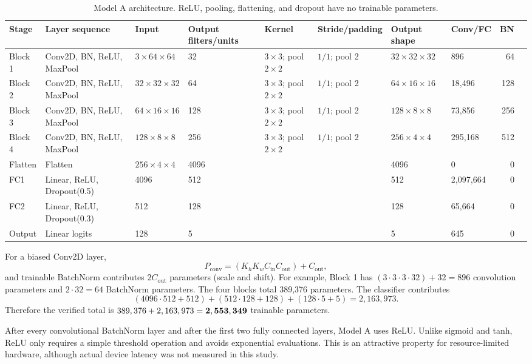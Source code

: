 \documentclass[11pt,a4paper]{article}
\renewcommand{\arraystretch}{1.30}
\newcommand{\dash}{\textemdash}
\begin{document}
\begin{table}[htbp]
\centering
\fontsize{6}{7}\selectfont
\setlength{\tabcolsep}{2pt}
\renewcommand{\arraystretch}{1.05}
\caption{Model A architecture. ReLU, pooling, flattening, and dropout have no trainable parameters.}
\begin{tabular*}{\linewidth}{@{\extracolsep{\fill}}llllllllrr}
\toprule
Stage & Layer sequence & Input & Output filters/units & Kernel & Stride/padding & Output shape & Conv/FC & BN\\
\midrule
Block 1 & Conv2D, BN, ReLU, MaxPool & $3\times64\times64$ & 32 & $3\times3$; pool $2\times2$ & $1/1$; pool 2 & $32\times32\times32$ & 896 & 64\\
Block 2 & Conv2D, BN, ReLU, MaxPool & $32\times32\times32$ & 64 & $3\times3$; pool $2\times2$ & $1/1$; pool 2 & $64\times16\times16$ & 18,496 & 128\\
Block 3 & Conv2D, BN, ReLU, MaxPool & $64\times16\times16$ & 128 & $3\times3$; pool $2\times2$ & $1/1$; pool 2 & $128\times8\times8$ & 73,856 & 256\\
Block 4 & Conv2D, BN, ReLU, MaxPool & $128\times8\times8$ & 256 & $3\times3$; pool $2\times2$ & $1/1$; pool 2 & $256\times4\times4$ & 295,168 & 512\\
Flatten & Flatten & $256\times4\times4$ & 4096 & \dash & \dash & 4096 & 0 & 0\\
FC1 & Linear, ReLU, Dropout(0.5) & 4096 & 512 & \dash & \dash & 512 & 2,097,664 & 0\\
FC2 & Linear, ReLU, Dropout(0.3) & 512 & 128 & \dash & \dash & 128 & 65,664 & 0\\
Output & Linear logits & 128 & 5 & \dash & \dash & 5 & 645 & 0\\
\bottomrule
\end{tabular*}
\end{table}



For a biased Conv2D layer,
\[
P_{\mathrm{conv}}=(K_hK_wC_{\mathrm{in}}C_{\mathrm{out}})+C_{\mathrm{out}},
\]
and trainable BatchNorm contributes $2C_{\mathrm{out}}$ parameters (scale and shift). For example, Block 1 has $(3\cdot3\cdot3\cdot32)+32=896$ convolution parameters and $2\cdot32=64$ BatchNorm parameters. The four blocks total 389,376 parameters. The classifier contributes
\[
(4096\cdot512+512)+(512\cdot128+128)+(128\cdot5+5)=2,163,973.
\]
Therefore the verified total is $389,376+2,163,973=\mathbf{2,553,349}$ trainable parameters.

After every convolutional BatchNorm layer and after the first two fully connected layers, Model A uses ReLU. Unlike sigmoid and tanh, ReLU only requires a simple threshold operation and avoids exponential evaluations. This is an attractive property for resource-limited hardware, although actual device latency was not measured in this study.
\end{document}
